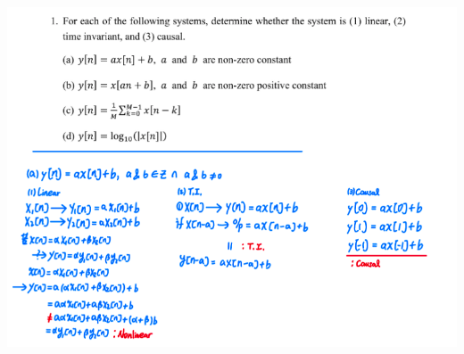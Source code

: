 \documentclass[a4paper]{article}
\begin{document}
	\begin{center}
		\includegraphics[width=1\linewidth]{screenshot009}
	\end{center}
	
\end{document}
